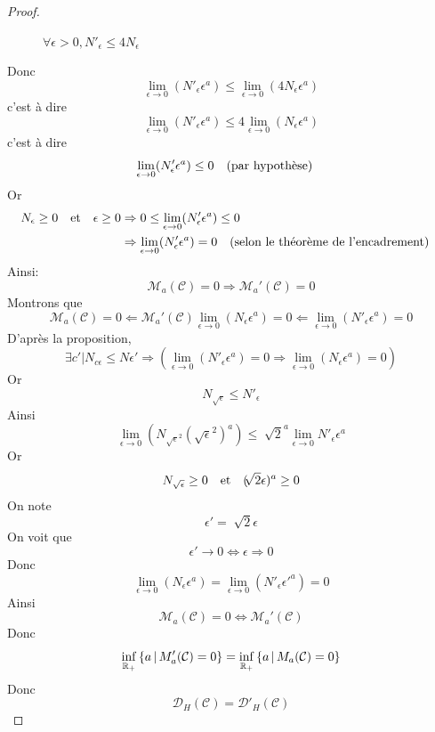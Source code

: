 \begin{proof}
\begin{figure}[h]
\caption{$\forall\epsilon > 0, N'_{\epsilon} \leq 4N_{\epsilon}$}
\label{fig:cases}
\end{figure}
Donc \[\lim\limits_{\epsilon\rightarrow0}(N'_\epsilon\epsilon^{a}) \leq \lim\limits_{\epsilon\rightarrow0}(4N_\epsilon\epsilon^{a})\]
c'est à dire \[\lim\limits_{\epsilon\rightarrow0}(N'_\epsilon\epsilon^{a}) \leq 4\lim\limits_{\epsilon\rightarrow0}(N_\epsilon\epsilon^{a})\]
c'est à dire \[\lim\limits_{\epsilon\rightarrow0}(N'_\epsilon\epsilon^{a}) \leq 0 \quad \text{(par hypothèse)} \quad\]
Or 
\begin{equation*}
\begin{split}
N_{\epsilon}\geq 0 \quad \text{et} \quad  \epsilon\geq0
& \Rightarrow 0 \leq \lim\limits_{\epsilon\rightarrow0}(N'_\epsilon\epsilon^{a}) \leq 0 \\
& \Rightarrow \lim\limits_{\epsilon\rightarrow0}(N'_\epsilon\epsilon^{a}) = 0 \quad \text{(selon le théorème de l'encadrement)} \quad
\end{split}
\end{equation*}
Ainsi: \[\mathcal{M}_{a}(\mathcal{C})=0 \Rightarrow \mathcal{M}_{a}'(\mathcal{C})=0\]
Montrons que \[\mathcal{M}_{a}(\mathcal{C})=0 \Leftarrow \mathcal{M}_{a}'(\mathcal{C}) 
\lim\limits_{\epsilon\rightarrow0}(N_{\epsilon}\epsilon^{a})=0 \Leftarrow \lim\limits_{\epsilon\rightarrow0}(N'_{\epsilon}\epsilon^{a})=0\]
D'après la proposition, \[\exists c' | N_{c\epsilon} \leq N\epsilon' \Rightarrow (\lim\limits_{\epsilon\rightarrow0}(N'_\epsilon\epsilon^{a})=0 \Rightarrow \lim\limits_{\epsilon\rightarrow0}(N_\epsilon\epsilon^{a})=0)\]
Or \[N_{\sqrt{\epsilon}} \leq N'_{\epsilon}\]
Ainsi \[\lim\limits_{\epsilon\rightarrow0}(N_{\sqrt{\epsilon}^2}(\sqrt{\epsilon}^2)^{a}) \leq \sqrt[]{2}^{a}\lim\limits_{\epsilon\rightarrow0}N'_{\epsilon}\epsilon^{a}\]
Or \[N_{\sqrt{\epsilon}} \geq 0 \quad \text{et} \quad (\sqrt[]{2}\epsilon)^{a} \geq0\]
On note \[\epsilon'=\sqrt[]{2}\epsilon\]
On voit que \[\epsilon'\rightarrow0 \Leftrightarrow \epsilon\Rightarrow0\]
Donc \[\lim\limits_{\epsilon\rightarrow0}(N_{\epsilon}\epsilon^{a})=\lim\limits_{\epsilon\rightarrow0}(N'_{\epsilon}\epsilon'^{a})=0\]
Ainsi \[\mathcal{M}_{a}(\mathcal{C})=0 \Leftrightarrow \mathcal{M}_{a}'(\mathcal{C})\]
Donc \[\inf_{\mathbb{R}_{+}}{\left\{a\,\middle|\,M'_{a}(\mathcal{C})=0\right\}}= \inf_{\mathbb{R}_{+}}{\left\{a\,\middle|\,M_{a}(\mathcal{C})=0\right\}}\]
Donc \[\mathcal{D}_{H}(\mathcal{C})=\mathcal{D}'_{H}(\mathcal{C})\]
\end{proof}
